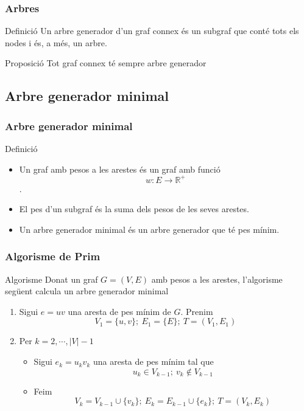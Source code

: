 \documentclass{beamer}
\begin{document}
\begin{frame}
\frametitle{Arbres}
\begin{block}{Definició}
Un arbre generador d'un graf connex és un subgraf que conté tots els nodes i és, a més, un arbre. 
\end{block}
\begin{block}{Proposició}
Tot graf connex té sempre arbre generador
\end{block}
\end{frame}


\subsection{Arbre generador minimal}


\begin{frame}
\frametitle{Arbre generador minimal}
\begin{block}{Definició}
\begin{itemize}
\item Un graf amb pesos a les arestes és un graf amb funció $$w:E\rightarrow \mathbb{R}^+$$. 
\item El pes d'un subgraf és la suma dels pesos de les seves arestes. 
\item Un arbre generador minimal és un arbre generador que té pes mínim.  
\end{itemize}
\end{block}
\end{frame}



\begin{frame}
\frametitle{Algorisme de Prim}
\begin{block}{Algorisme}
Donat un graf $G=(V,E)$ amb pesos a les arestes, l'algorisme següent calcula un arbre generador minimal
\begin{enumerate}
\item Sigui $e=uv$ una aresta de pes mínim de $G$. Prenim
\[V_1 =\{u,v\};\ E_1 = \{E\};\ T=(V_1,E_1) \]
\item Per $k=2,\cdots, |V|-1$
\begin{itemize}
\item Sigui $e_k=u_kv_k$ una aresta de pes mínim tal que 
\[u_k\in V_{k-1};\ v_k\not\in V_{k-1}\]
\item Feim 
\[V_k = V_{k-1}\cup \{v_k\};\ E_k = E_{k-1}\cup \{e_k\};\ T = (V_k, E_k)\]
\end{itemize}
\end{enumerate}
\end{block}
\end{frame}
\end{document}
